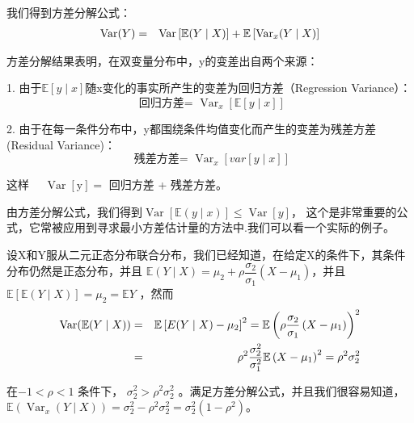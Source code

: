 \begin{enumerate}
\begin{enumerate} [i)]
				我们得到方差分解公式：
				\begin{eqnarray}
				\operatorname{Var}(Y) & = & \operatorname{Var}\left [ \mathbb{E}(Y \mid X) \right ] + \mathbb{E}\left[\operatorname{Var}_{x}(Y \mid X)\right] \notag 
				\end{eqnarray}
				
				方差分解结果表明，在双变量分布中，y的变差出自两个来源：
				
				1. 由于$ \mathbb{E}[y \mid x] $随x变化的事实所产生的变差为回归方差（Regression Variance）：
				$$ \text { 回归方差= } \operatorname{Var}_{x}[\mathbb{E}[y \mid x]] $$
				
				2. 由于在每一条件分布中，y都围绕条件均值变化而产生的变差为残差方差(Residual Variance)：
				$$ \text { 残差方差= } \operatorname{Var}_{x}[var[y \mid x]] $$
				
				
				这样 $\quad \operatorname{Var}[\mathrm{y}] = $ 回归方差  +  残差方差。
				
				
				由方差分解公式，我们得到$ \operatorname{Var}[\mathbb{E}(y \mid x)] \le  \operatorname{Var}[y] $，
				这个是非常重要的公式，它常被应用到寻求最小方差估计量的方法中.我们可以看一个实际的例子。
				
				\begin{myexample} 
					设X和Y服从二元正态分布联合分布，我们已经知道，在给定X的条件下，其条件分布仍然是正态分布，并且 $ \mathbb{E} (Y \mid X)=\mu_{2}+\rho 
					\dfrac{\sigma_{2}}{\sigma_{1}}\left(X-\mu_{1}\right) $，并且 $ \mathbb{E}\left [ \mathbb{E}(Y \mid X) \right ] =\mu_{2}=\mathbb{E} Y $ ，然而
					\begin{eqnarray}
					\operatorname{Var}(\mathbb{E}(Y \mid X))  & = & \mathbb{E}\left[E(Y \mid X)-\mu_{2}\right]^{2} 
					=  \mathbb{E} \left(\rho \dfrac{\sigma_{2}}{\sigma_{1}}\left(X-\mu_{1}\right)\right)^{2} \notag \\
					& = & \rho^{2} \dfrac{\sigma_{2}^{2}}{\sigma_{1}^{2}} \mathbb{E} \left(X-\mu_{1}\right)^{2}  =  \rho^{2} \sigma_{2}^{2} \notag
					\end{eqnarray}
					
					在$ -1< \rho<1 $ 条件下， $  \sigma_{2}^{2}>\rho^{2} \sigma_{2}^{2}  $ 。满足方差分解公式，并且我们很容易知道，
					$ \mathbb{E} \left(\operatorname{Var}_{x}(Y \mid X)\right)=\sigma_{2}^{2}-\rho^{2} \sigma_{2}^{2}=\sigma_{2}^{2}\left(1-\rho^{2}\right)  $。
				\end{myexample}
			\end{enumerate}
	\end{enumerate}


